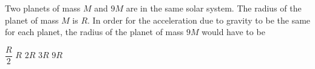 \documentclass{../../oss-apphys-exam}
\begin{document}
\begin{multicols*}{2}
\begin{questions}
    \question Two planets of mass $M$ and $9M$ are in the same solar system. The
    radius of the planet of mass $M$ is $R$. In order for the acceleration due
    to gravity to be the same for each planet, the radius of the planet of mass
    $9M$ would have to be
    \begin{choices}
      \choice $\dfrac R2$
      \choice $R$
      \choice $2R$
      \choice $3R$
      \choice $9R$
    \end{choices}
    
%
%

\end{questions}
\end{multicols*}
\end{document}
